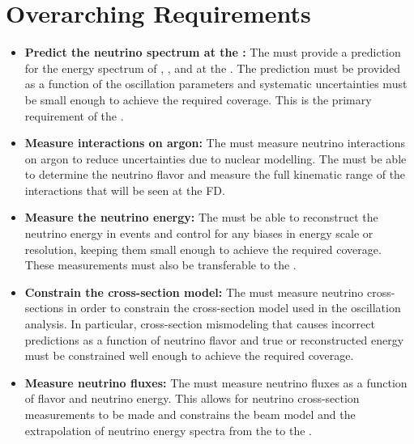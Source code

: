 \section{Overarching Requirements}

\begin{itemize}
    \item {{\bf Predict the neutrino spectrum at the :}} The  must provide a prediction for the energy spectrum of \numu, \anumu, \nue and \anue at the . The prediction must be provided as a function of the oscillation parameters and systematic uncertainties must be small enough to achieve the required  coverage. This is the primary requirement of the  .
    
    \item{{\bf Measure interactions on argon:}} The  must measure neutrino interactions on argon to reduce uncertainties due to nuclear modelling. The  must be able to determine the neutrino flavor and measure the full kinematic range of the interactions that will be seen at the FD.
    
    \item{{\bf Measure the neutrino energy:}} The  must be able to reconstruct the neutrino energy in  events and control for any biases in energy scale or resolution, keeping them small enough to achieve the required  coverage. These measurements must also be transferable to the . %
    
    \item{{\bf Constrain the cross-section model:}} The  must measure neutrino cross-sections in order to constrain the cross-section model used in the oscillation analysis. In particular, cross-section mismodeling that causes incorrect  predictions as a function of neutrino flavor and true or reconstructed energy must be constrained well enough to achieve the required  coverage. 
    
    \item{{\bf Measure neutrino fluxes:}} The  must measure neutrino fluxes as a function of flavor and neutrino energy. This allows for neutrino cross-section measurements to be made and constrains the beam model and the extrapolation of neutrino energy spectra from the  to the .
    

\end{itemize}
